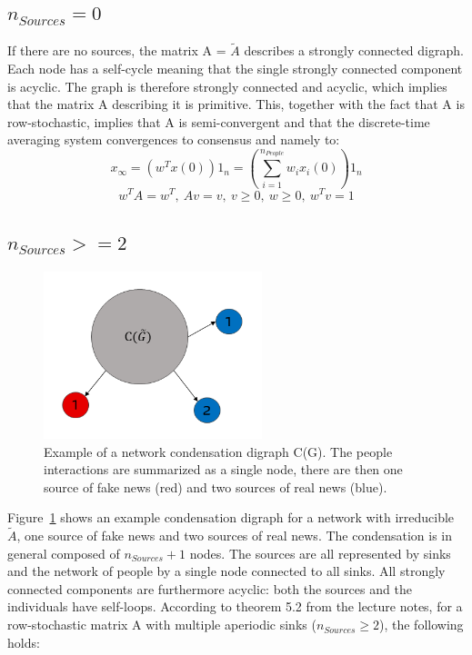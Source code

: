 \subsection{$n_{Sources} = 0$}
If there are no sources, the matrix A = $\tilde{A}$ describes a strongly connected digraph. Each node has a self-cycle meaning that the single strongly connected component is acyclic. The graph is therefore strongly connected and acyclic, which implies that the matrix A describing it is primitive. This, together with the fact that A is row-stochastic, implies that A is semi-convergent and that the discrete-time averaging system convergences to consensus and namely to:
$$
x_{\infty} = (w^Tx(0))1_n = \left(\sum_{i=1}^{n_{People}}w_ix_i(0)\right)1_n
$$
$$
w^TA = w^T,\ 
Av = v,\ 
v \geq 0,\ w \geq 0,\ w^Tv = 1
$$
\subsection{$n_{Sources} >= 2$}
\begin{figure}[!t]
	\centering
	\includegraphics[width=2.5in]{Figures/condensation_digraph.png}
	\caption{Example of a network condensation digraph C(G). The people interactions are summarized as a single node, there are then one source of fake news (red) and two sources of real news (blue).}
	\label{pics:condensation_digraph_example}
\end{figure}
Figure~\ref{pics:condensation_digraph_example} shows an example condensation digraph for a network with irreducible $\tilde{A}$, one source of fake news and two sources of real news. The condensation is in general composed of $n_{Sources}+1$ nodes. The sources are all represented by sinks and the network of people by a single node connected to all sinks. \newline
All strongly connected components are furthermore acyclic: both the sources and the individuals have self-loops.
According to theorem 5.2 from the lecture notes, for a row-stochastic matrix A with multiple aperiodic sinks ($n_{Sources} \geq 2$), the following holds:
